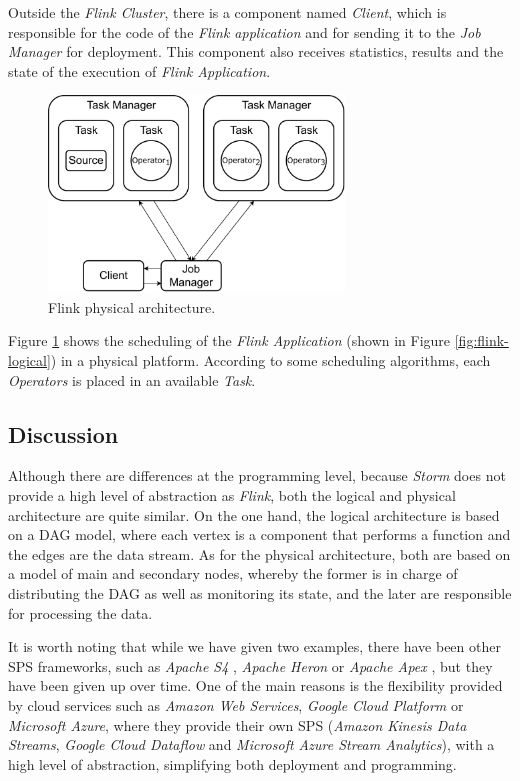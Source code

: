 Outside the \textit{Flink Cluster}, there is a component named \textit{Client}, which is responsible for the code of the \textit{Flink application} and for sending it to the \textit{Job Manager} for deployment. This component also receives statistics, results and the state of the execution of \textit{Flink Application}.

\begin{figure}[!ht]
     \centering
     \includegraphics[width=0.7\textwidth]{figures/concepts/Flink-Physical.pdf}
     \caption{Flink physical architecture.}
     \label{fig:flink-physical}
\end{figure}

Figure \ref{fig:flink-physical} shows the scheduling of the \textit{Flink Application} (shown in Figure \ref{fig:flink-logical}) in a physical platform. According to some scheduling algorithms, each \textit{Operators} is placed in an available \textit{Task}.

\subsection{Discussion}
Although there are differences at the programming level, because \textit{Storm} does not provide a high level of abstraction as \textit{Flink}, both the logical and physical architecture are quite similar. On the one hand, the logical architecture is based on a DAG model, where each vertex is a component that performs a function and the edges are the data stream. As for the physical architecture, both are based on a model of main and secondary nodes, whereby the former is in charge of distributing the DAG as well as monitoring its state, and the later are responsible for processing the data.

It is worth noting that while we have given two examples, there have been other SPS frameworks, such as \textit{Apache S4} \citep{NeumeyerRNK10}, \textit{Apache Heron} \citep{KulkarniBFKKMPR15} or \textit{Apache Apex} \citep{GundabattulaW19}, but they have been given up over time. One of the main reasons is the flexibility provided by cloud services such as \textit{Amazon Web Services}, \textit{Google Cloud Platform} or \textit{Microsoft Azure}, where they provide their own SPS (\textit{Amazon Kinesis Data Streams}, \textit{Google Cloud Dataflow} and \textit{Microsoft Azure Stream Analytics}), with a high level of abstraction, simplifying both deployment and programming.

